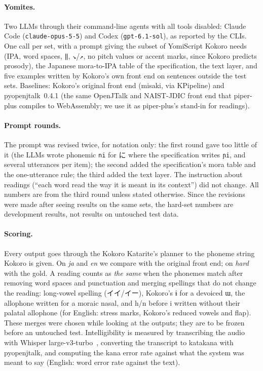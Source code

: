 \documentclass[11pt,a4paper]{article}
\newcommand{\ys}[1]{\mbox{\texttt{#1}}}
\begin{document}
\paragraph{Yomites.} Two LLMs through their command-line agents with all tools disabled: Claude Code
(\texttt{claude-opus-5-5}) and Codex (\texttt{gpt-6.1-sol}), as reported by the CLIs. One call per set, with a prompt
giving the subset of YomiScript Kokoro needs (IPA, word spaces, \ys{‖}, \ys{↘}/\ys{↗}, no pitch values or accent marks,
since Kokoro predicts prosody), the Japanese mora-to-IPA table of the specification, the text layer, and five examples
written by Kokoro's own front end on sentences outside the test sets. Baselines: Kokoro's original front end (misaki,
via KPipeline) and pyopenjtalk~0.4.1 (the same OpenJTalk and NAIST-JDIC front end that piper-plus compiles to
WebAssembly; we use it as piper-plus's stand-in for readings).

\paragraph{Prompt rounds.} The prompt was revised twice, for notation only: the first round gave too little of it (the
LLMs wrote phonemic \ys{ni} for に where the specification writes \ys{ɲi}, and several utterances per item); the second
added the specification's mora table and the one-utterance rule; the third added the text layer. The instruction about
readings (``each word read the way it is meant in its context'') did not change. All numbers are from the third round
unless stated otherwise. Since the revisions were made after seeing results on the same sets, the hard-set numbers are
development results, not results on untouched test data.

\paragraph{Scoring.} Every output goes through the Kokoro Katarite's planner to the phoneme string Kokoro is given. On
\emph{ja} and \emph{en} we compare with the original front end; on \emph{hard} with the gold. A reading counts as
\emph{the same} when the phonemes match after removing word spaces and punctuation and merging spellings that do not
change the reading: long-vowel spelling (イイ/イー), Kokoro's ɨ for a devoiced ɯ, the allophone written for a moraic
nasal, and h/n before i written without their palatal allophone (for English: stress marks, Kokoro's reduced vowels and
flap). These merges were chosen while looking at the outputs; they are to be frozen before an untouched test. Intelligibility is measured by transcribing the audio with Whisper large-v3-turbo~\citep{radford2023whisper},
converting the transcript to katakana with pyopenjtalk, and computing the kana error rate against what the system was
meant to say (English: word error rate against the text).
\end{document}
